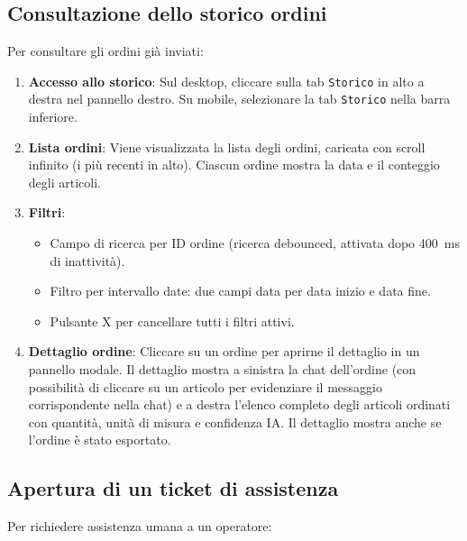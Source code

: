 \documentclass[a4paper, 11pt, oneside]{scrartcl}
\begin{document}
\subsection{Consultazione dello storico ordini}

Per consultare gli ordini gi\`a inviati:

\begin{enumerate}
    \item \textbf{Accesso allo storico}: Sul desktop, cliccare sulla tab \texttt{Storico} in alto a destra nel pannello destro. Su mobile, selezionare la tab \texttt{Storico} nella barra inferiore.
    \item \textbf{Lista ordini}: Viene visualizzata la lista degli ordini, caricata con scroll infinito (i pi\`u recenti in alto). Ciascun ordine mostra la data e il conteggio degli articoli.
    \item \textbf{Filtri}:
    \begin{itemize}
        \item Campo di ricerca per ID ordine (ricerca debounced, attivata dopo 400~ms di inattivit\`a).
        \item Filtro per intervallo date: due campi data per data inizio e data fine.
        \item Pulsante X per cancellare tutti i filtri attivi.
    \end{itemize}
    \item \textbf{Dettaglio ordine}: Cliccare su un ordine per aprirne il dettaglio in un pannello modale. Il dettaglio mostra a sinistra la chat dell'ordine (con possibilit\`a di cliccare su un articolo per evidenziare il messaggio corrispondente nella chat) e a destra l'elenco completo degli articoli ordinati con quantit\`a, unit\`a di misura e confidenza IA. Il dettaglio mostra anche se l'ordine \`e stato esportato.
\end{enumerate}

\subsection{Apertura di un ticket di assistenza}

Per richiedere assistenza umana a un operatore:
\end{document}
